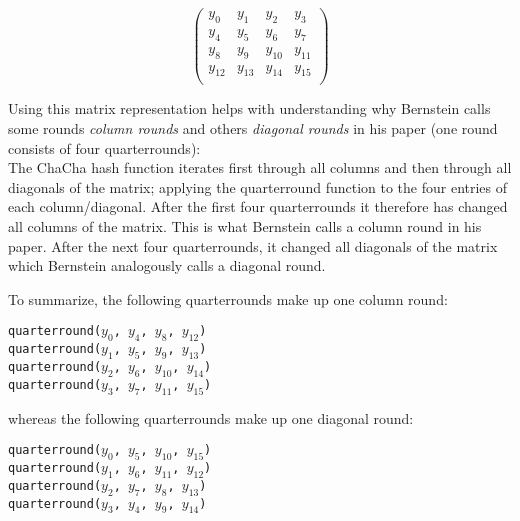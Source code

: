 \begin{equation*}
\begin{pmatrix}
y_0 & y_1 & y_2 & y_3 \\
y_4 & y_5 & y_6 & y_7 \\
y_8 & y_9 & y_{10} & y_{11} \\
y_{12} & y_{13} & y_{14} & y_{15}\\
\end{pmatrix}
\end{equation*}

Using this matrix representation helps with understanding why Bernstein calls some rounds \textit{column rounds} and others \textit{diagonal rounds} in his paper (one round consists of four quarterrounds): \\
The ChaCha hash function iterates first through all columns and then through all diagonals of the matrix; applying the quarterround function to the four entries of each column/diagonal. After the first four quarterrounds it therefore has changed all columns of the matrix. This is what Bernstein calls a column round in his paper. After the next four quarterrounds, it changed all diagonals of the matrix which Bernstein analogously calls a diagonal round.

To summarize, the following quarterrounds make up one column round:
\begin{center}
\begin{minipage}{0.5\linewidth}
\texttt{quarterround($y_0$, $y_4$, $y_8$, $y_{12}$)} \\
\texttt{quarterround($y_1$, $y_5$, $y_9$, $y_{13}$)} \\
\texttt{quarterround($y_2$, $y_6$, $y_{10}$, $y_{14}$)} \\
\texttt{quarterround($y_3$, $y_7$, $y_{11}$, $y_{15}$)} \\
\end{minipage}
\end{center}
\noindent whereas the following quarterrounds make up one diagonal round:
\begin{center}
\begin{minipage}{0.5\linewidth}
\texttt{quarterround($y_0$, $y_5$, $y_{10}$, $y_{15}$)} \\
\texttt{quarterround($y_1$, $y_6$, $y_{11}$, $y_{12}$)} \\
\texttt{quarterround($y_2$, $y_7$, $y_8$, $y_{13}$)} \\
\texttt{quarterround($y_3$, $y_4$, $y_9$, $y_{14}$)} \\
\end{minipage}
\end{center}

